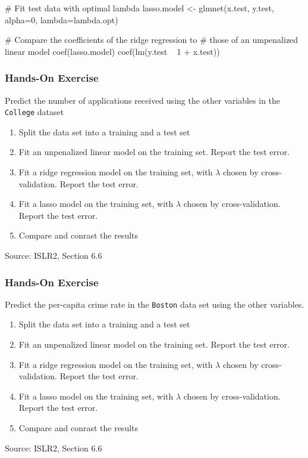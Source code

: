 \begin{samepage}
\begin{Rcode}
# Fit test data with optimal lambda
lasso.model <- glmnet(x.test, y.test, 
                      alpha=0, lambda=lambda.opt)

# Compare the coefficients of the ridge regression to
# those of an umpenalized linear model
coef(lasso.model)
coef(lm(y.test ~ 1 + x.test))
\end{Rcode}
\end{samepage}



\begin{tcolorbox}[colback=code]
\subsubsection*{Hands-On Exercise} 

Predict the number of applications received using the other variables in the \texttt{College} dataset
  \begin{enumerate} 
      \item Split the data set into a training and a test set
      \item Fit an unpenalized linear model on the training set. Report the test error.
      \item Fit a ridge regression model on the training set, with $\lambda$ chosen by cross-validation. Report the test error.
      \item Fit a lasso model on the training set, with $\lambda$ chosen by cross-validation. Report the test error.
      \item Compare and conrast the results
  \end{enumerate}

\footnotesize Source: ISLR2, Section 6.6 \normalsize
\end{tcolorbox}


\begin{tcolorbox}[colback=code]
\subsubsection*{Hands-On Exercise} 

Predict the per-capita crime rate in the \texttt{Boston} data set using the other variables.
  \begin{enumerate}
      \item Split the data set into a training and a test set
      \item Fit an unpenalized linear model on the training set. Report the test error.
      \item Fit a ridge regression model on the training set, with $\lambda$ chosen by cross-validation. Report the test error.
      \item Fit a lasso model on the training set, with $\lambda$ chosen by cross-validation. Report the test error.
      \item Compare and conrast the results
  \end{enumerate}

\footnotesize Source: ISLR2, Section 6.6 \normalsize
\end{tcolorbox}

